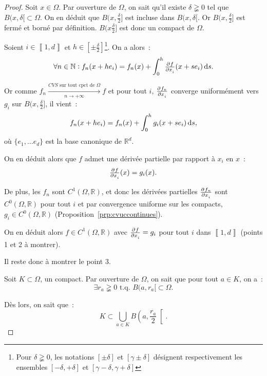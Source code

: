 \documentclass{report}
\theoremstyle{definition}
\theoremstyle{remark}
\numberwithin{equation}{section}
\newcommand{\R}{\mathbb R}
\newcommand{\N}{\mathbb N}
\newcommand{\tq}{\text{ t.q. }}
\newcommand{\CONV}[5]{\xrightarrow[#2 \to #3]{#4 \text{ #5 } #1}}
\newcommand{\CVSc}[3]{\CONV{#1}{#2}{#3}{CVS}{sur tout cpct de}}
\newcommand{\intint}[2]{\left\llbracket#1, #2\right\rrbracket}
\newcommand{\pinfty}{{+\infty}}
\begin{document}
			\begin{proof} Soit $x \in \Omega$. Par ouverture de $\Omega$, on sait qu'il existe $\delta \gneqq 0$ tel que $B(x, \delta[ \subset \Omega$.
			On en déduit que $B(x, \frac \delta2]$ est incluse dans $B(x, \delta[$. Or $B(x, \frac \delta2]$ est fermé et borné par définition.
			$B(x \frac \delta2]$ est donc un compact de $\Omega$.

			Soient $i \in \intint 1d$ et $h \in [\pm \frac \delta2]$\footnote{Pour $\delta \gneqq 0$, les notations $[\pm \delta]$ et $[\gamma \pm \delta]$
			désignent respectivement les ensembles $[-\delta, +\delta]$ et $[\gamma-\delta, \gamma+\delta]$}. On a alors~:
			\begin{equation}
				\forall n \in \N : f_n(x + he_i) = f_n(x) + \int_0^h\pd f{x_i}(x+s e_i)\dif s.
			\end{equation}

			Or comme $f_n \CVSc \Omega n\pinfty f$ et pour tout $i$, $\pd {f_n}{x_i}$ converge uniformément vers $g_i$ sur $B(x, \frac \delta2]$, il vient~:
			\begin{equation}
				f_n(x + he_i) = f_n(x) + \int_0^hg_i(x+se_i)\dif s,
			\end{equation}
			où $\{e_1, \ldots e_d\}$ est la base canonique de $\R^d$.

			On en déduit alors que $f$ admet une dérivée partielle par rapport à $x_i$ en $x$~:
			\begin{equation}
				\pd f{x_i}(x) = g_i(x).
			\end{equation}

			De plus, les $f_n$ sont $C^1(\Omega, \R)$, et donc les dérivées partielles $\pd {f_n}{x_i}$ sont $C^0(\Omega, \R)$ pour tout $i$ et par convergence
			uniforme sur les compacts, $g_i \in C^0(\Omega, \R)$ (Proposition~\ref{prp:cvuccontinues}).

			On en déduit alors $f \in C^1(\Omega, \R)$ avec $\pd f{x_i} = g_i$ pour tout $i$ dans $\intint 1d$ (points 1 et 2 à montrer).

			Il reste donc à montrer le point 3.

			Soit $K \subset \Omega$, un compact. Par ouverture de $\Omega$, on sait que pour tout $a \in K$, on a~:
			\begin{equation}
				\exists r_a \gneqq 0 \tq B(a, r_a[ \subset \Omega.
			\end{equation}

			Dès lors, on sait que~:
			\begin{equation}
				K \subset \bigcup_{a \in K}B\left(a, \frac {r_a}2\right[.
			\end{equation}


\end{proof}
\end{document}
